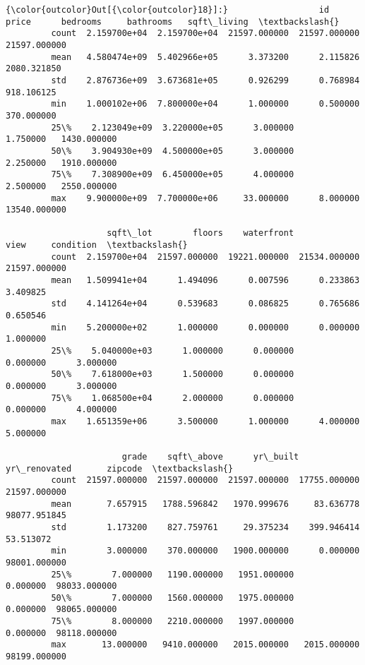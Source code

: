 \documentclass[11pt]{article}
\begin{document}
\begin{Verbatim}[commandchars=\\\{\}]
{\color{outcolor}Out[{\color{outcolor}18}]:}                  id         price      bedrooms     bathrooms   sqft\_living  \textbackslash{}
         count  2.159700e+04  2.159700e+04  21597.000000  21597.000000  21597.000000   
         mean   4.580474e+09  5.402966e+05      3.373200      2.115826   2080.321850   
         std    2.876736e+09  3.673681e+05      0.926299      0.768984    918.106125   
         min    1.000102e+06  7.800000e+04      1.000000      0.500000    370.000000   
         25\%    2.123049e+09  3.220000e+05      3.000000      1.750000   1430.000000   
         50\%    3.904930e+09  4.500000e+05      3.000000      2.250000   1910.000000   
         75\%    7.308900e+09  6.450000e+05      4.000000      2.500000   2550.000000   
         max    9.900000e+09  7.700000e+06     33.000000      8.000000  13540.000000   
         
                    sqft\_lot        floors    waterfront          view     condition  \textbackslash{}
         count  2.159700e+04  21597.000000  19221.000000  21534.000000  21597.000000   
         mean   1.509941e+04      1.494096      0.007596      0.233863      3.409825   
         std    4.141264e+04      0.539683      0.086825      0.765686      0.650546   
         min    5.200000e+02      1.000000      0.000000      0.000000      1.000000   
         25\%    5.040000e+03      1.000000      0.000000      0.000000      3.000000   
         50\%    7.618000e+03      1.500000      0.000000      0.000000      3.000000   
         75\%    1.068500e+04      2.000000      0.000000      0.000000      4.000000   
         max    1.651359e+06      3.500000      1.000000      4.000000      5.000000   
         
                       grade    sqft\_above      yr\_built  yr\_renovated       zipcode  \textbackslash{}
         count  21597.000000  21597.000000  21597.000000  17755.000000  21597.000000   
         mean       7.657915   1788.596842   1970.999676     83.636778  98077.951845   
         std        1.173200    827.759761     29.375234    399.946414     53.513072   
         min        3.000000    370.000000   1900.000000      0.000000  98001.000000   
         25\%        7.000000   1190.000000   1951.000000      0.000000  98033.000000   
         50\%        7.000000   1560.000000   1975.000000      0.000000  98065.000000   
         75\%        8.000000   2210.000000   1997.000000      0.000000  98118.000000   
         max       13.000000   9410.000000   2015.000000   2015.000000  98199.000000   
         

\end{Verbatim}
\end{document}
